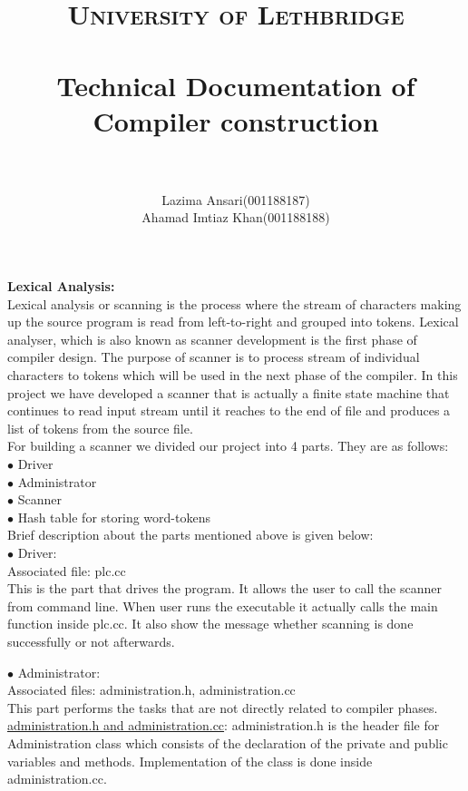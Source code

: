 \documentclass[paper=letter, fontsize=12pt]{scrartcl} %
\title{	
\normalfont \normalsize 
\textsc{University of Lethbridge} \\ [25pt] %
\horrule{0.5pt} \\[0.4cm] %
\huge Technical Documentation of Compiler construction\\ %
\horrule{2pt} \\[0.5cm] %
}
\author{Lazima Ansari(001188187) \\ Ahamad Imtiaz Khan(001188188)} %
\begin{document}
\maketitle
\newpage
\pagebreak
{\bf {\huge Lexical Analysis:}}\\
Lexical analysis or scanning is the process where the stream of characters making up the source program is read from left-to-right and grouped into tokens. Lexical analyser, which is also known as scanner development is the first phase of compiler design. The purpose of scanner is to process stream of individual characters to tokens which will be used in the next phase of the compiler. In this project we have developed a scanner that is actually a finite state machine that continues to read input stream until it reaches to the end of file and produces a list of tokens from the source file.\\
For building a scanner we divided our project into 4 parts. They are as follows:\\
$\bullet$ Driver\\
$\bullet$ Administrator\\
$\bullet$ Scanner\\
$\bullet$ Hash table for storing word-tokens\\

Brief description about the parts mentioned above is given below:\\
$\bullet$ Driver:\\

Associated file: plc.cc\\
This is the part that drives the program. It allows the user to call the scanner from command line. When user runs the executable it actually calls the main function inside plc.cc. It also show the message whether scanning is done successfully or not afterwards.

$\bullet$ Administrator:\\

Associated files: administration.h, administration.cc\\
This part performs the tasks that are not directly related to compiler phases.\\

\underline {administration.h and administration.cc}: administration.h is the header file for Administration class which consists of the declaration of the private and public variables and methods. Implementation of the class is done inside administration.cc.\\
\end{document}
